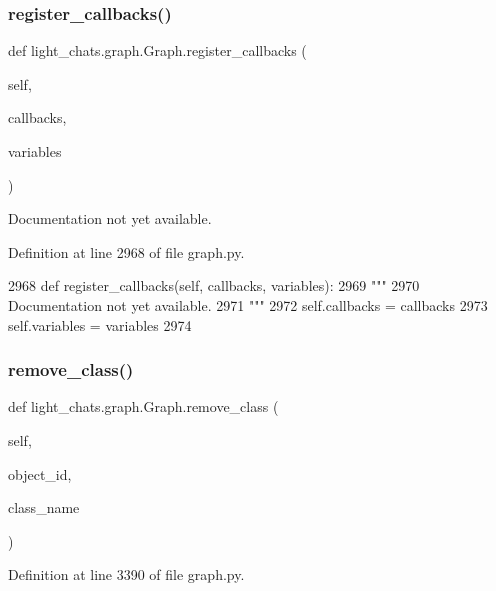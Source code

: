 \subsubsection{\texorpdfstring{register\+\_\+callbacks()}{register\_callbacks()}}
{\footnotesize\ttfamily def light\+\_\+chats.\+graph.\+Graph.\+register\+\_\+callbacks (\begin{DoxyParamCaption}\item[{}]{self,  }\item[{}]{callbacks,  }\item[{}]{variables }\end{DoxyParamCaption})}

\begin{DoxyVerb}Documentation not yet available.
\end{DoxyVerb}
 

Definition at line 2968 of file graph.\+py.


\begin{DoxyCode}
2968     \textcolor{keyword}{def }register\_callbacks(self, callbacks, variables):
2969         \textcolor{stringliteral}{"""}
2970 \textcolor{stringliteral}{        Documentation not yet available.}
2971 \textcolor{stringliteral}{        """}
2972         self.callbacks = callbacks
2973         self.variables = variables
2974 
\end{DoxyCode}
\mbox{\label{classlight__chats_1_1graph_1_1Graph_ab799f6160a4e8dd1550b2e245cdd2d53}} 
\subsubsection{\texorpdfstring{remove\+\_\+class()}{remove\_class()}}
{\footnotesize\ttfamily def light\+\_\+chats.\+graph.\+Graph.\+remove\+\_\+class (\begin{DoxyParamCaption}\item[{}]{self,  }\item[{}]{object\+\_\+id,  }\item[{}]{class\+\_\+name }\end{DoxyParamCaption})}



Definition at line 3390 of file graph.\+py.


